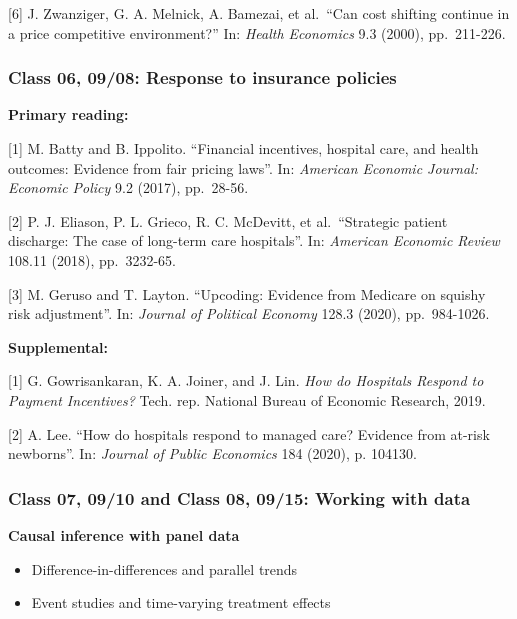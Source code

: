 \documentclass[11pt,]{article}
\providecommand{\tightlist}{%
  \setlength{\itemsep}{0pt}\setlength{\parskip}{0pt}}
\begin{document}
{[}6{]} J. Zwanziger, G. A. Melnick, A. Bamezai, et al.~``Can cost
shifting continue in a price competitive environment?'' In: \emph{Health
Economics} 9.3 (2000), pp.~211-226.

\hypertarget{class-06-0908-response-to-insurance-policies}{%
\subsubsection{Class 06, 09/08: Response to insurance
policies}\label{class-06-0908-response-to-insurance-policies}}

\textbf{Primary reading:}

{[}1{]} M. Batty and B. Ippolito. ``Financial incentives, hospital care,
and health outcomes: Evidence from fair pricing laws''. In:
\emph{American Economic Journal: Economic Policy} 9.2 (2017), pp.~28-56.

{[}2{]} P. J. Eliason, P. L. Grieco, R. C. McDevitt, et al.~``Strategic
patient discharge: The case of long-term care hospitals''. In:
\emph{American Economic Review} 108.11 (2018), pp.~3232-65.

{[}3{]} M. Geruso and T. Layton. ``Upcoding: Evidence from Medicare on
squishy risk adjustment''. In: \emph{Journal of Political Economy} 128.3
(2020), pp.~984-1026.

\textbf{Supplemental:}

{[}1{]} G. Gowrisankaran, K. A. Joiner, and J. Lin. \emph{How do
Hospitals Respond to Payment Incentives?} Tech. rep. National Bureau of
Economic Research, 2019.

{[}2{]} A. Lee. ``How do hospitals respond to managed care? Evidence
from at-risk newborns''. In: \emph{Journal of Public Economics} 184
(2020), p. 104130.

\hypertarget{class-07-0910-and-class-08-0915-working-with-data}{%
\subsubsection{Class 07, 09/10 and Class 08, 09/15: Working with
data}\label{class-07-0910-and-class-08-0915-working-with-data}}

\textbf{Causal inference with panel data}

\begin{itemize}
\tightlist
\item
  Difference-in-differences and parallel trends
\item
  Event studies and time-varying treatment effects
\end{itemize}
\end{document}
